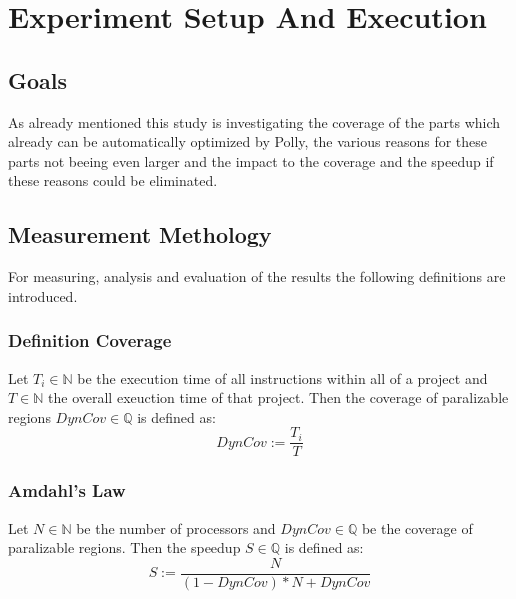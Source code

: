\chapter{Experiment Setup And Execution}
\section{Goals}
As already mentioned this study is investigating the coverage of the parts which already can be automatically optimized by Polly, the various reasons for these parts not beeing even larger and the impact to the coverage and the speedup if these reasons could be eliminated.

\section{Measurement Methology}
For measuring, analysis and evaluation of the results the following definitions are introduced.
\subsection{Definition Coverage}
Let \(T_i\in\mathbb{N}\) be the execution time of all instructions within all \scops of a project and \(T\in\mathbb{N}\) the overall exeuction time of that project.
Then the coverage of paralizable regions \(DynCov\in\mathbb{Q}\) is defined as:
\[DynCov := \frac{T_i}{T}\]

\subsection[Amdahl's Law]{Amdahl's Law \cite{AmdahlsLaw}}
Let \(N\in\mathbb{N}\) be the number of processors and \(DynCov\in\mathbb{Q}\) be the coverage of paralizable regions.
Then the speedup \(S\in\mathbb{Q}\) is defined as:
\[S := \frac{N}{(1-DynCov)*N+DynCov}\]

